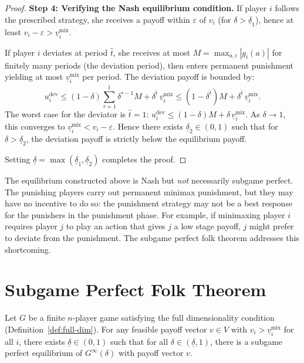 \documentclass[11pt,a4paper]{article}
\begin{document}
\begin{proof}
\textbf{Step 4: Verifying the Nash equilibrium condition.}
If player $i$ follows the prescribed strategy, she receives a payoff
within $\varepsilon$ of $v_i$ (for $\delta > \underline{\delta}_1$), hence
at least $v_i - \varepsilon > \underline{v}_i^{\mathrm{mix}}$.

If player $i$ deviates at period $\hat{t}$, she receives at most
$M = \max_{a,i} |g_i(a)|$ for finitely many periods (the deviation
period), then enters permanent punishment yielding at most
$\underline{v}_i^{\mathrm{mix}}$ per period. The deviation payoff is
bounded by:
\[
    u_i^{\mathrm{dev}} \leq (1-\delta)\sum_{\tau=1}^{\hat{t}}
    \delta^{\tau-1} M + \delta^{\hat{t}}\,
    \underline{v}_i^{\mathrm{mix}}
    \leq (1-\delta^{\hat{t}}) M + \delta^{\hat{t}}\,
    \underline{v}_i^{\mathrm{mix}}.
\]
The worst case for the deviator is $\hat{t} = 1$:
$u_i^{\mathrm{dev}} \leq (1-\delta) M + \delta\,
\underline{v}_i^{\mathrm{mix}}$. As $\delta \to 1$, this converges to
$\underline{v}_i^{\mathrm{mix}} < v_i - \varepsilon$. Hence there exists
$\underline{\delta}_2 \in (0,1)$ such that for
$\delta > \underline{\delta}_2$, the deviation payoff is strictly below
the equilibrium payoff.

Setting $\underline{\delta} = \max(\underline{\delta}_1,
\underline{\delta}_2)$ completes the proof.
\end{proof}

\begin{remark}
The equilibrium constructed above is Nash but \emph{not} necessarily
subgame perfect. The punishing players carry out permanent minimax
punishment, but they may have no incentive to do so: the punishment
strategy may not be a best response for the punishers in the punishment
phase. For example, if minimaxing player $i$ requires player $j$ to play
an action that gives $j$ a low stage payoff, $j$ might prefer to deviate
from the punishment. The subgame perfect folk theorem addresses this
shortcoming.
\end{remark}


\section{Subgame Perfect Folk Theorem}
\label{sec:spe-folk}

\begin{keyresult}[title={Subgame Perfect Folk Theorem}]
\begin{theorem}
\label{thm:spe-folk}
Let $G$ be a finite $n$-player game satisfying the full dimensionality
condition (Definition~\ref{def:full-dim}). For any feasible payoff vector
$v \in V$ with $v_i > \underline{v}_i^{\mathrm{mix}}$ for all $i$, there
exists $\underline{\delta} \in (0,1)$ such that for all
$\delta \in (\underline{\delta}, 1)$, there is a subgame perfect
equilibrium of $G^\infty(\delta)$ with payoff vector $v$.
\end{theorem}
\end{keyresult}
\end{document}
